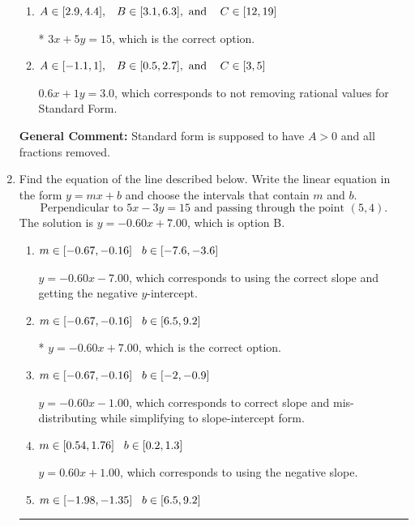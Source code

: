 \documentclass{extbook}[14pt]
\newcommand{\litem}[1]{\item #1

\rule{\textwidth}{0.4pt}}
\begin{document}
\begin{enumerate}
{\begin{enumerate}[label=\Alph*.]
 $-3x - 5y = -15$, which corresponds to not making $A$ positive (by multiplying the equation by $-1$).
\item \( A \in [2.9, 4.4], \hspace{3mm} B \in [3.1, 6.3], \text{ and } \hspace{3mm} C \in [12, 19] \)

* $3x + 5y = 15$, which is the correct option.
\item \( A \in [-1.1, 1], \hspace{3mm} B \in [0.5, 2.7], \text{ and } \hspace{3mm} C \in [3, 5] \)

 $0.6x + 1y = 3.0$, which corresponds to not removing rational values for Standard Form.
\end{enumerate}

\textbf{General Comment:} Standard form is supposed to have $A > 0$ and all fractions removed.
}
\litem{
Find the equation of the line described below. Write the linear equation in the form $ y=mx+b $ and choose the intervals that contain $m$ and $b$.
\[ \text{Perpendicular to } 5 x - 3 y = 15 \text{ and passing through the point } (5, 4). \]The solution is \( y = -0.60x + 7.00 \), which is option B.\begin{enumerate}[label=\Alph*.]
\item \( m \in [-0.67, -0.16] \hspace*{3mm} b \in [-7.6, -3.6] \)

 $y = -0.60x - 7.00$, which corresponds to using the correct slope and getting the negative $y$-intercept.
\item \( m \in [-0.67, -0.16] \hspace*{3mm} b \in [6.5, 9.2] \)

* $y = -0.60x + 7.00$, which is the correct option.
\item \( m \in [-0.67, -0.16] \hspace*{3mm} b \in [-2, -0.9] \)

 $y = -0.60x - 1.00$, which corresponds to correct slope and mis-distributing while simplifying to slope-intercept form.
\item \( m \in [0.54, 1.76] \hspace*{3mm} b \in [0.2, 1.3] \)

 $y = 0.60x + 1.00$, which corresponds to using the negative slope.
\item \( m \in [-1.98, -1.35] \hspace*{3mm} b \in [6.5, 9.2] \)


\end{enumerate}}
\end{enumerate}
\end{document}
